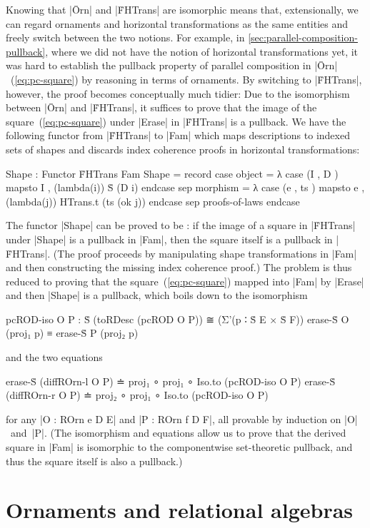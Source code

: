 Knowing that |Ōrn| and |ḞHTrans| are isomorphic means that, extensionally, we can regard ornaments and horizontal transformations as the same entities and freely switch between the two notions.
For example, in \autoref{sec:parallel-composition-pullback}, where we did not have the notion of horizontal transformations yet, it was hard to establish the pullback property of parallel composition in |Ōrn|~(\ref{eq:pc-square}) by reasoning in terms of ornaments.
By switching to |ḞHTrans|, however, the proof becomes conceptually much tidier:
Due to the isomorphism between |Ōrn| and |ḞHTrans|, it suffices to prove that the image of the square~(\ref{eq:pc-square}) under |Erase| in |ḞHTrans| is a pullback.
We have the following functor from |ḞHTrans| to |Fam| which maps descriptions to indexed sets of shapes and discards index coherence proofs in horizontal transformations:
\begin{code}
Shape : Functor ḞHTrans Fam
Shape = record
  case  object    = λ case (I , D   ) mapsto I  , (lambda(i)) Ṡ (D i)                 endcase
  sep   morphism  = λ case (e , ts  ) mapsto e  , (lambda({j})) HTrans.t (ts (ok j))  endcase
  sep   proofs-of-laws endcase
\end{code}
The functor |Shape| can be proved to be : if the image of a square in |ḞHTrans| under |Shape| is a pullback in |Fam|, then the square itself is a pullback in |ḞHTrans|.
(The proof proceeds by manipulating shape transformations in |Fam| and then constructing the missing index coherence proof.)
The problem is thus reduced to proving that the square~(\ref{eq:pc-square}) mapped into |Fam| by |Erase| and then |Shape| is a pullback, which boils down to the isomorphism
\begin{code}
pcROD-iso O P :  Ṡ (toRDesc (pcROD O P))
                   ≅ (Σ'(p ∶ Ṡ E × Ṡ F)) erase-Ṡ O (proj₁ p) ≡ erase-Ṡ P (proj₂ p)
\end{code}
and the two equations
\begin{code}
erase-Ṡ (diffROrn-l  O P) ≐ proj₁  ∘ proj₁ ∘ Iso.to (pcROD-iso O P)
erase-Ṡ (diffROrn-r  O P) ≐ proj₂  ∘ proj₁ ∘ Iso.to (pcROD-iso O P)
\end{code}
for any |O : ROrn e D E| and |P : ROrn f D F|, all provable by induction on |O|~and~|P|.
(The isomorphism and equations allow us to prove that the derived square in |Fam| is isomorphic to the componentwise set-theoretic pullback, and thus the square itself is also a pullback.)

\section{Ornaments and relational algebras}
\label{sec:ornaments-and-relational-algebras}

